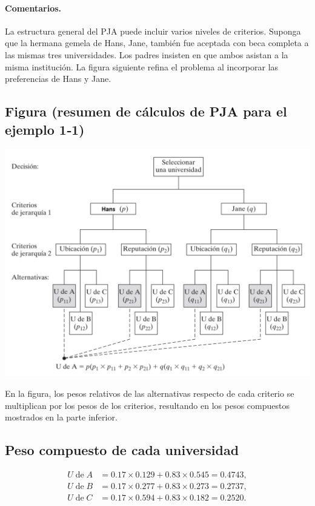 \documentclass[11pt]{scrartcl}
\begin{document}
\paragraph{Comentarios.} La estructura general del PJA puede incluir varios niveles de criterios. Suponga que la hermana gemela de Hans, Jane, también fue aceptada con beca completa a las mismas tres universidades. Los padres insisten en que ambos asistan a la misma institución. La figura siguiente refina el problema al incorporar las preferencias de Hans y Jane.

\subsection*{Figura (resumen de cálculos de PJA para el ejemplo 1‑1)}

\begin{center}
    \includegraphics[width=\linewidth]{images/26-decision01.png}
\end{center}
\medskip
En la figura, los pesos relativos de las alternativas respecto de cada criterio se multiplican por los pesos de los criterios, resultando en los pesos compuestos mostrados en la parte inferior.

\subsection*{Peso compuesto de cada universidad}
\begin{align*}
U\;\text{de}\;A&=0.17\times0.129+0.83\times0.545=0.4743,\\
U\;\text{de}\;B&=0.17\times0.277+0.83\times0.273=0.2737,\\
U\;\text{de}\;C&=0.17\times0.594+0.83\times0.182=0.2520.
\end{align*}
\end{document}
